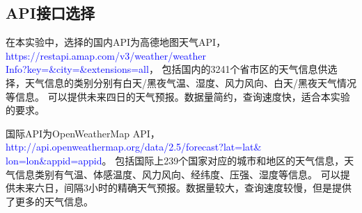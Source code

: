 \documentclass[UTF8]{ctexart}
\begin{document}
\subsection{API接口选择}
在本实验中，选择的国内API为高德地图天气API，
\textcolor{blue}{https://restapi.amap.com/v3/weather/weather\\Info?key={}\&city={}\&extensions=all}，
包括国内的3241个省市区的天气信息供选择，天气信息的类别分别有白天/黑夜气温、湿度、风力风向、白天/黑夜天气情况等信息。
可以提供未来四日的天气预报。数据量简约，查询速度快，适合本实验的要求。

国际API为OpenWeatherMap API，
\textcolor{blue}{http://api.openweathermap.org/data/2.5/forecast?lat={lat}\&\\lon={lon}\&appid={appid}}。
包括国际上239个国家对应的城市和地区的天气信息，天气信息类别有气温、体感温度、风力风向、经纬度、压强、湿度等信息。
可以提供未来六日，间隔3小时的精确天气预报。数据量较大，查询速度较慢，但是提供了更多的天气信息。
\end{document}
